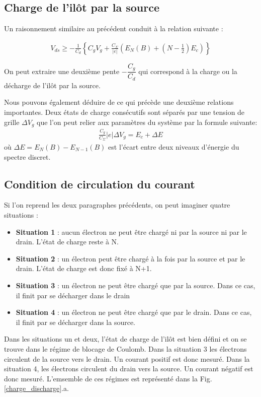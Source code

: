 \subsection{Charge de l'il\^ot par la source}
Un raisonnement similaire au précédent conduit à la relation suivante :

\begin{eqnarray}
V_{ds} \geq -\frac{1}{C_d} \left\lbrace C_gV_g + \frac{C_{\Sigma}}{|e|}\left( E_N(B) + (N-\frac{1}{2})E_c \right) \right\rbrace
\end{eqnarray}


On peut extraire une deuxième pente $-\dfrac{C_g}{C_d}$ qui correspond à la charge ou la décharge de l'il\^ot par la source.

Nous pouvons également déduire de ce qui précède une deuxième relations importantes. Deux états de charge consécutifs sont séparés par une tension de grille $\Delta V_g$ que l'on peut relier aux paramètres du système par la formule suivante:
\begin{eqnarray}
\frac{C_g}{C_{\Sigma}} |e| \Delta V_g = E_c + \Delta E
\end{eqnarray}
où $\Delta E = E_N(B) - E_{N-1}(B)$ est l'écart entre deux niveaux d'énergie du spectre discret.
\subsection{Condition de circulation du courant}

Si l'on reprend les deux paragraphes précédents, on peut imaginer quatre situations :
\begin{itemize}
\item \textbf{Situation 1} : aucun électron ne peut \^etre chargé ni par la source ni par le drain. L'état de charge reste à N.
\item \textbf{Situation 2} : un électron peut \^etre chargé à la fois par la source et par le drain. L'état de charge est donc fixé à N+1.
\item \textbf{Situation 3} : un électron ne peut \^etre chargé que par la source. Dans ce cas, il finit par se décharger dans le drain
\item \textbf{Situation 4} : un électron ne peut \^etre chargé que par le drain. Dans ce cas, il finit par se décharger dans la source. \newline
\end{itemize}

Dans les situations un et deux, l'état de charge de l'il\^ot est bien défini et on se trouve dans le régime de blocage de Coulomb. Dans la situation 3 les électrons circulent de la source vers le drain. Un courant positif est donc mesuré. Dans la situation 4, les électrons circulent du drain vers la source. Un courant négatif est donc mesuré. L'emsemble de ces régimes est représenté dans la Fig. \ref{charge_discharge}.a. 

